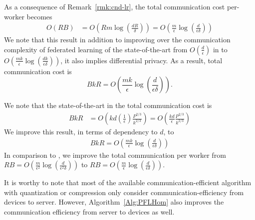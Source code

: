 \begin{corollary}
As a consequence of Remark~\ref{rmk:cnd-lr}, the total communication cost per-worker becomes \begin{align}
O\left(RB\right)&=O\left(Rm\log \left(\frac{d R}{\delta}\right)\right)=O\left(\frac{m }{\epsilon}\log \left(\frac{d }{\epsilon\delta}\right)\right)
\end{align}
We note that this result in addition to improving over the communication complexity of federated learning of the state-of-the-art from $O\left(\frac{d}{\epsilon}\right)$ in \cite{karimireddy2019scaffold,wang2018cooperative,liang2019variance} to $O\left(\frac{m k}{\epsilon}\log \left(\frac{d k}{\epsilon\delta}\right)\right)$, it also implies differential privacy. As a result, total communication cost is 
$$BkR=O\left(\frac{m k}{\epsilon}\log \left(\frac{d }{\epsilon\delta}\right)\right).$$ 

We note that the state-of-the-art in \cite{karimireddy2019scaffold} the total communication cost is 
\begin{align}
    BkR&=O\left(kd\left(\frac{1}{\epsilon}\right)\frac{P^{2/3}}{k^{2/3}} \right)=O\left(\frac{kd}{\epsilon}\frac{P^{2/3}}{k^{2/3}}\right) 
\end{align}
We improve this result, in terms of dependency to $d$, to 
\begin{align}
    BkR=O\left(\frac{m k}{\epsilon}\log \left(\frac{d }{\epsilon\delta}\right)\right)
\end{align}
In comparison to \cite{ivkin2019communication}, we improve the total communication per worker from $RB=O\left(\frac{m }{\epsilon^2}\log \left(\frac{d }{\epsilon^2\delta}\right)\right)$ to $RB=O\left(\frac{m }{\epsilon}\log \left(\frac{d }{\epsilon\delta}\right)\right)$.
\end{corollary}

\begin{remark}
It is worthy to note that most of the available communication-efficient algorithm with quantization or compression only consider communication-efficiency from devices to server. However, Algorithm~\ref{Alg:PFLHom} also improves the communication efficiency from server to devices as well. 
\end{remark}


